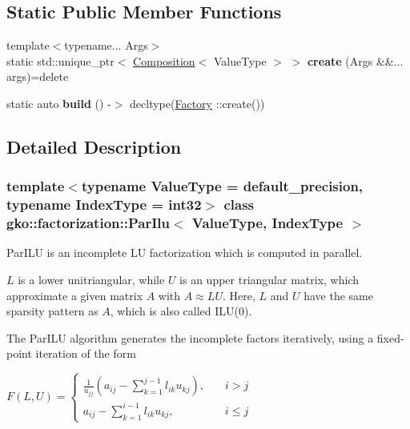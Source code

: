 \subsection*{Static Public Member Functions}
\begin{DoxyCompactItemize}
\item 
\mbox{\label{classgko_1_1factorization_1_1ParIlu_abb7e4c208a809f3101b87713dfe867d3}} 
{\footnotesize template$<$typename... Args$>$ }\\static std\+::unique\+\_\+ptr$<$ \hyperlink{classgko_1_1Composition}{Composition}$<$ Value\+Type $>$ $>$ {\bfseries create} (Args \&\&... args)=delete
\item 
\mbox{\label{classgko_1_1factorization_1_1ParIlu_a304722cc01ca9d5fd33ac988c0949b5e}} 
static auto {\bfseries build} () -\/$>$ decltype(\hyperlink{classgko_1_1factorization_1_1ParIlu_1_1Factory}{Factory} \+::create())
\end{DoxyCompactItemize}


\subsection{Detailed Description}
\subsubsection*{template$<$typename Value\+Type = default\+\_\+precision, typename Index\+Type = int32$>$\newline
class gko\+::factorization\+::\+Par\+Ilu$<$ Value\+Type, Index\+Type $>$}

Par\+I\+LU is an incomplete LU factorization which is computed in parallel. 

$L$ is a lower unitriangular, while $U$ is an upper triangular matrix, which approximate a given matrix $A$ with $A \approx LU$. Here, $L$ and $U$ have the same sparsity pattern as $A$, which is also called I\+L\+U(0).

The Par\+I\+LU algorithm generates the incomplete factors iteratively, using a fixed-\/point iteration of the form

$ F(L, U) = \begin{cases} \frac{1}{u_{jj}} \left(a_{ij}-\sum_{k=1}^{j-1}l_{ik}u_{kj}\right), \quad & i>j \\ a_{ij}-\sum_{k=1}^{i-1}l_{ik}u_{kj}, \quad & i\leq j \end{cases} $

